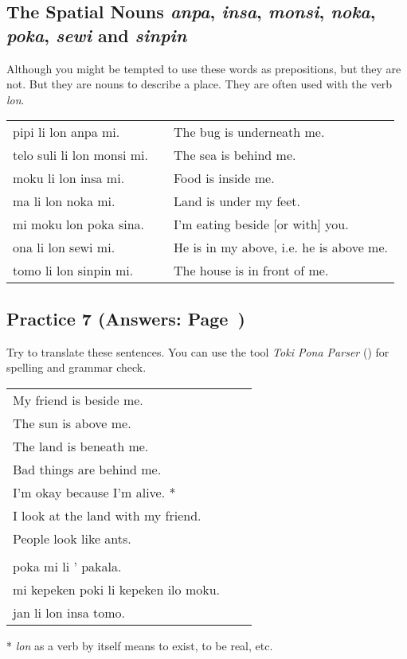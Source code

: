 \subsection*{The Spatial Nouns \textit{anpa}, \textit{insa}, \textit{monsi}, \textit{noka}, \textit{poka}, \textit{sewi} and \textit{sinpin}}
%
Although you might be tempted to use these words as prepositions, but they are not. 
But they are nouns to describe a place.
They are often used with the verb \textit{lon}. 

\begin{supertabular}{p{5,5cm}|ll}
pipi li lon anpa mi.       && The bug is underneath me. \\
telo suli li lon monsi mi. && The sea is behind me.  \\
moku li lon insa mi.       && Food is inside me. \\
ma li lon noka mi.         && Land is under my feet. \\
mi moku lon poka sina.     && I'm eating beside [or with] you. \\
ona li lon sewi mi.        && He is in my above, i.e. he is above me. \\
tomo li lon sinpin mi.     && The house is in front of me. \\
\end{supertabular} 
%
%
\subsection*{Practice 7 (Answers: Page~\pageref{'other_prepositions'})}
%
Try to translate these sentences. 
You can use the tool \textit{Toki Pona Parser} (\cite{www:rowa:02}) for spelling and grammar check. 

\begin{supertabular}{p{5,5cm}|ll}
My friend is beside me. && \\ %
The sun is above me. && \\ %
The land is beneath me. && \\ %
Bad things are behind me. && \\ %
I'm okay because I'm alive. * && \\ %
I look at the land with my friend. && \\ %
People look like ants. && \\ %
 && \\ %
poka mi li ' pakala. && \\ %
mi kepeken poki li kepeken ilo moku. && \\ %
jan li lon insa tomo. && \\ %
\end{supertabular} 

* \textit{lon} as a verb by itself means to exist, to be real, etc. 
% 
